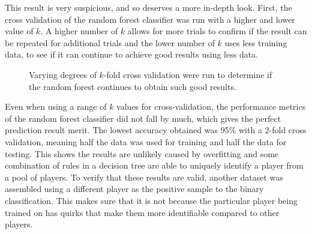\documentclass[Report.tex]{subfiles}
\begin{document}
This result is very suspicious, and so deserves a more in-depth look. First, the cross validation of the random forest classifier was run with a higher and lower value of $k$. A higher number of $k$ allows for more trials to confirm if the result can be repeated for additional trials and the lower number of $k$ uses less training data, to see if it can continue to achieve good results using less data. 

\newcommand{\rfplotbar}[2] {
\addplot+[mark=none] table [x=cv, y=#1, col sep=comma] {data/15-game-rf.csv};
\addlegendentry{#2}
}
\begin{figure}[H]
\caption{Varying degrees of $k$-fold cross validation were run to determine if the random forest continues to obtain such good results.}
\end{figure}

Even when using a range of $k$ values for cross-validation, the performance metrics of the random forest classifier did not fall by much, which gives the perfect prediction result merit. The lowest accuracy obtained was 95\% with a 2-fold cross validation, meaning half the data was used for training and half the data for testing. This shows the results are unlikely caused by overfitting and some combination of rules in a decision tree are able to uniquely identify a player from a pool of players. To verify that these results are valid, another dataset was assembled using a different player as the positive sample to the binary classification. This makes sure that it is not because the particular player being trained on has quirks that make them more identifiable compared to other players. 
\end{document}

